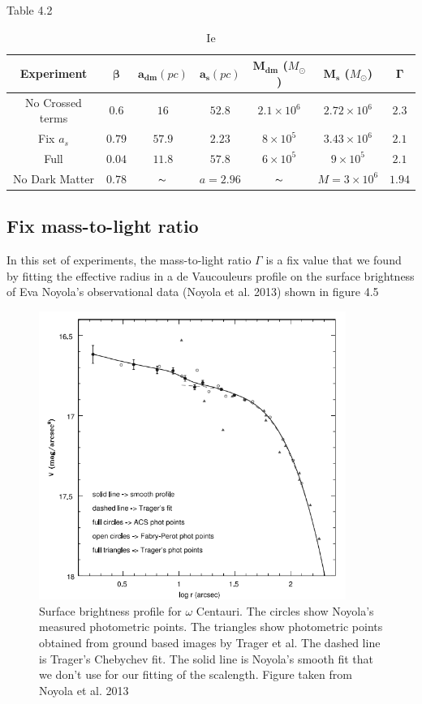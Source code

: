 Table 4.2

\begin{table}[H]
\begin{center}
\begin{tabular}{| c| c| c| c| c| c| c|}
    \hline
    \textbf{Experiment} & $\mathbf{\beta}$ & $\mathbf{a_{dm}} (pc)$ & $\mathbf{a_{s}} (pc)$ & $\mathbf{M_{dm}}$ ($M_{\odot}$) & $\mathbf{M_{s}}$ ($M_{\odot}$) & $\mathbf{\Gamma}$\\ \hline
	No Crossed terms & $0.6$ &	$16$ &	$52.8$ &	$2.1 \times 10^{6}$ &	$2.72 \times 10^{6}$ &	$2.3$\\ \hline
	Fix $a_s$ &	$0.79$ &	$57.9$ &	$2.23$ &	$8 \times 10^{5}$ &	$3.43 \times 10 ^{6}$ &	$2.1$\\ \hline
	Full &	$0.04$ &	$11.8$ &	$57.8$ &	$6 \times 10^{5}$ &	$9 \times 10^{5}$ &	$2.1$\\ \hline
	No Dark Matter &	$0.78$ &	$\thicksim$ & $ a = 2.96$ &	$\thicksim$ & $  M = 3 \times 10^{6}$ & 	$1.94$\\
    \hline
  \end{tabular} 
\caption[It]{Ie}
\end{center}
  
\end{table}

\subsection{Fix mass-to-light ratio}

In this set of experiments, the mass-to-light ratio $\Gamma$ is a fix value that we found by fitting the effective radius in a de Vaucouleurs profile on the surface brightness of Eva Noyola's observational data (Noyola et al. 2013) shown in figure 4.5

\begin{figure}[H]
\centering
\includegraphics[width=10cm]{images/noyola.png}
\caption[Pg]{Surface brightness profile for $\omega$ Centauri. The circles show
Noyola's measured photometric points. The triangles show photometric points obtained
from ground based images by Trager et al. The dashed line
is Trager’s Chebychev fit. The solid line is Noyola's smooth fit that we don't use for our fitting of the scalength. Figure taken from Noyola et al. 2013}
\end{figure}

